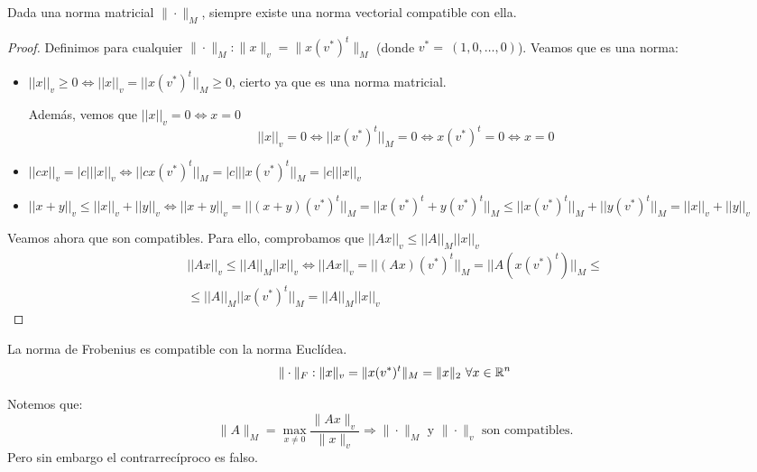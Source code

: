 \newtheorem*{propCompatible}{Proposición}
\begin{prop}
    Dada una norma matricial $\|\cdot\|_M$, siempre existe una norma vectorial compatible con ella.
\end{prop}
\begin{proof}
    Definimos para cualquier $\|\cdot\|_M : \|x\|_v = \|x(v^{*})^t\|_M$ (donde $v^{*}=~(1, 0, \ldots, 0)$). Veamos que es una norma:
    \begin{itemize}
        \item $||x||_v \geq 0 \Longleftrightarrow ||x||_v = ||x(v^\ast)^t||_M \geq 0$, cierto ya que es una norma matricial.

        Además, vemos que $||x||_v = 0 \Longleftrightarrow x=0$
        $$||x||_v = 0 \Longleftrightarrow ||x(v^\ast)^t||_M = 0 \Longleftrightarrow x(v^\ast)^t = 0 \Longleftrightarrow x=0$$

        \item $||cx||_v = |c|||x||_v \Longleftrightarrow ||cx(v^\ast)^t||_M = |c|||x(v^\ast)^t||_M = |c| ||x||_v$

        \item $||x+y||_v \leq ||x||_v + ||y||_v \Longleftrightarrow ||x+y||_v = ||(x+y)(v^\ast)^t||_M = ||x(v^\ast)^t + y(v^\ast)^t||_M \leq ||x(v^\ast)^t||_M + ||y(v^\ast)^t||_M = ||x||_v + ||y||_v$
    \end{itemize}

    Veamos ahora que son compatibles. Para ello, comprobamos que $||Ax||_v \leq ||A||_M ||x||_v$
    \begin{multline*}
        ||Ax||_v \leq ||A||_M ||x||_v \Longleftrightarrow ||Ax||_v = ||(Ax)(v^\ast)^t||_M = ||A(x(v^\ast)^t)||_M
        \leq \\ \leq
        ||A||_M ||x(v^\ast)^t||_M = ||A||_M ||x||_v
    \end{multline*}
\end{proof}

\begin{observacion}
La norma de Frobenius es compatible con la norma Euclídea.
\begin{equation*}
    \|\cdot\|_F: \|x\|_v = \|x(v^{*})^t\|_M = \|x\|_2 \ \forall x \in \mathbb R^n
\end{equation*}
\end{observacion}

Notemos que:
$$\|A\|_M = \max_{x\neq 0}\dfrac{\|Ax\|_v}{\|x\|_v} \Rightarrow \|\cdot\|_M \mbox{ y } \|\cdot\|_v \mbox{ son compatibles.}$$
Pero sin embargo el contrarrecíproco es falso.

